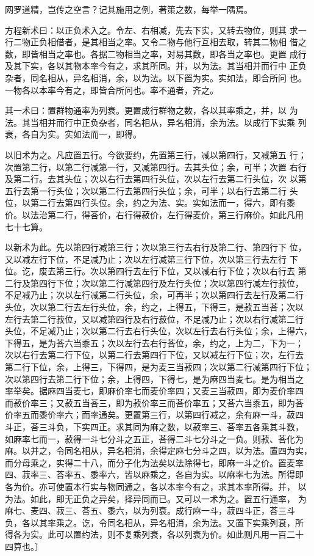 \documentclass[a4paper,12pt,UTF8,twoside]{ctexbook}
\begin{document}
网罗道精，岂传之空言？记其施用之例，著策之数，每举一隅焉。

方程新术曰：以正负术入之。令左、右相减，先去下实，又转去物位，则其 求一行二物正负相借者，是其相当之率。又令二物与他行互相去取，转其二物相 借之数，即皆相当之率也。各据二物相当之率，对易其数，即各当之率也。更置 成行及其下实，各以其物本率今有之，求其所同。并，以为法。其当相并而行中 正负杂者，同名相从，异名相消，余，以为法。以下置为实。实如法，即合所问 也。一物各以本率今有之，即皆合所问也。率不通者，齐之。

其一术曰：置群物通率为列衰。更置成行群物之数，各以其率乘之，并，以 为法。其当相并而行中正负杂者，同名相从，异名相消，余为法。以成行下实乘 列衰，各自为实。实如法而一，即得。

以旧术为之。凡应置五行。今欲要约，先置第三行，减以第四行，又减第五 行；次置第二行，以第二行减第一行，又减第四行。去其头位；余，可半；次置 右行及第二行。去其头位；次以右行去第四行头位，次以左行去第二行头位，次 以第五行去第一行头位；次以第二行去第四行头位；余，可半；以右行去第二行 头位，以第二行去第四行头位。余，约之为法、实。实如法而一，得六，即有黍 价。以法治第二行，得荅价，右行得菽价，左行得麦价，第三行麻价。如此凡用 七十七算。

以新术为此。先以第四行减第三行；次以第三行去右行及第二行、第四行下 位，又以减左行下位，不足减乃止；次以左行减第三行下位，次以第三行去左行 下位。讫，废去第三行。次以第四行去左行下位，又以减右行下位；次以右行去 第二行及第四行下位；次以第二行减第四行及左行头位；次以第四行减左行菽位， 不足减乃止；次以左行减第二行头位，余，可再半；次以第四行去左行及第二行 头位，次以第二行去左行头位，余，约之，上得五，下得三，是菽五当荅；次以 左行去第二行菽位，又以减第四行及右行菽位，不足减乃止；次以右行减第二行 头位，不足减乃止；次以第二行去右行头位，次以左行去右行头位；余，上得六， 下得五，是为荅六当黍五；次以左行去右行荅位，余，约之，上为二，下为一； 次以右行去第二行下位，以第二行去第四行下位，又以减左行下位；次，左行去 第二行下位，余，上得三，下得四，是为麦三当菽四；次以第二行减第四行下位； 次以第四行去第二行下位；余，上得四，下得七，是为麻四当麦七。是为相当之 率举矣。据麻四当麦七，即麻价率七而麦价率四；又麦三当菽四，即为麦价率四 而菽价率三；又菽五当荅三，即为菽价率三而荅价率五；又荅六当黍五，即为荅 价率五而黍价率六；而率通矣。更置第三行，以第四行减之，余有麻一斗，菽四 斗正，荅三斗负，下实四正。求其同为麻之数，以菽率三、荅率五各乘其斗数， 如麻率七而一，菽得一斗七分斗之五正，荅得二斗七分斗之一负。则菽、荅化为 麻。以并之，令同名相从，异名相消，余得定麻七分斗之四，以为法。置四为实， 而分母乘之，实得二十八，而分子化为法矣以法除得七，即麻一斗之价。置麦率 四、菽率三、荅率五、黍率六，皆以麻乘之，各自为实。以麻率七为法。所得即 各为价。亦可使置本行实与物同通之，各以本率今有之，求其本率所得。并， 以为法。如此，即无正负之异矣，择异同而已。又可以一术为之。置五行通率， 为麻七、麦四、菽三、荅五、黍六，以为列衰。成行麻一斗，菽四斗正，荅三斗 负，各以其率乘之。讫，令同名相从，异名相消，余为法。又置下实乘列衰，所 得各为实。此可以置约法，则不复乘列衰，各以列衰为价。如此则凡用一百二十 四算也。〕 
\end{document}
